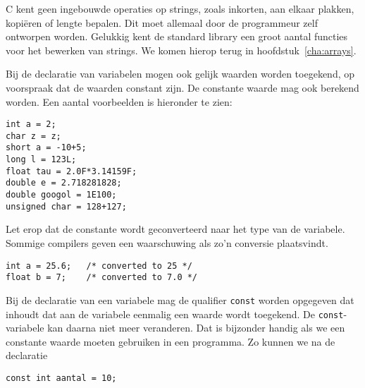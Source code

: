 C kent geen ingebouwde operaties op strings, zoals inkorten, aan elkaar plakken, kopiëren of lengte bepalen. Dit moet allemaal door de programmeur zelf ontworpen worden. Gelukkig kent de standard library een groot aantal functies voor het bewerken van strings. We komen hierop terug in hoofdstuk~\ref{cha:arrays}.

Bij de declaratie van variabelen mogen ook gelijk waarden worden toegekend, op voorspraak dat de waarden constant zijn. De constante waarde mag ook berekend worden. Een aantal voorbeelden is hieronder te zien:

\hspace*{1em}\texttt{int a = 2;}\\
\hspace*{1em}\texttt{char z = \textquotesingle z\textquotesingle;}\\
\hspace*{1em}\texttt{short a = -10+5;}\\
\hspace*{1em}\texttt{long l = 123L;}\\
\hspace*{1em}\texttt{float tau = 2.0F*3.14159F;}\\
\hspace*{1em}\texttt{double e = 2.718281828;}\\
\hspace*{1em}\texttt{double googol = 1E100;}\\
\hspace*{1em}\texttt{unsigned char = 128+127;}

Let erop dat de constante wordt geconverteerd naar het type van de variabele. Sommige compilers geven een waarschuwing als zo'n conversie plaatsvindt.

\hspace*{1em}\texttt{int a = 25.6; \ \ /* converted to 25 */}\\
\hspace*{1em}\texttt{float b = 7; \ \ \ /* converted to 7.0 */}

Bij de declaratie van een variabele mag de qualifier \texttt{const} worden opgegeven dat inhoudt dat aan  de variabele eenmalig een waarde wordt toegekend. De \texttt{const}-variabele kan daarna niet meer veranderen. Dat is bijzonder handig als we een constante waarde moeten gebruiken in een programma. Zo kunnen we na de declaratie

\hspace*{1em}\texttt{const int aantal = 10;}

